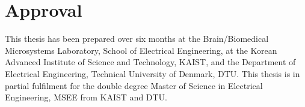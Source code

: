 \thispagestyle{main}

\chapter*{Approval}
This thesis has been prepared over six months at the Brain/Biomedical Microsystems Laboratory, School of Electrical Engineering, at the Korean Advanced Institute of Science and Technology, KAIST, and the Department of Electrical Engineering, Technical University of Denmark, DTU. This thesis is in partial fulfilment for the double degree Master of Science in Electrical Engineering, MSEE from KAIST and DTU.

\vfill

\begin{center}
\namesigdate{\thesisauthor~-~\studentnumber}
\end{center}
\thispagestyle{empty}
\vfill


